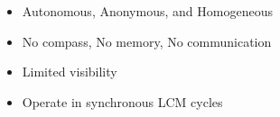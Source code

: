 \begin{frame}{}

\begin{columns}[T,totalwidth=\textwidth]
\begin{itemize}\setlength\itemsep{0.4cm}
  \item<1-> Autonomous, Anonymous, and Homogeneous
  \item<2-> No compass, No memory, No communication
  \item<3-> Limited visibility
  \item<4-> Operate in synchronous LCM cycles
\end{itemize}

\vspace{0.6cm}
\resizebox{\linewidth}{!}{}
\end{columns}

\end{frame}
